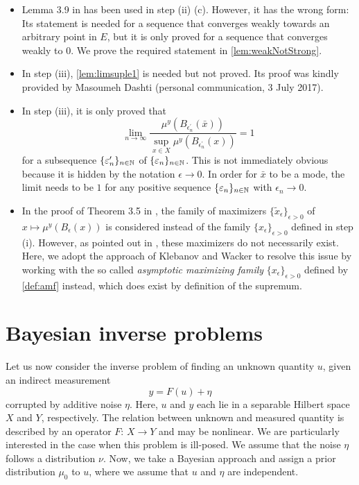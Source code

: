 \documentclass[english]{jnsao}
\theoremstyle{definition}
\begin{document}
\begin{itemize}
	\item[(C1)] Lemma 3.9 in \cite{Dashti:2013} has been used in step (ii) (c). However, it has the wrong form: Its statement is needed for a sequence that converges weakly towards an arbitrary point in $E$, but it is only proved for a sequence that converges weakly to $0$. We prove the required statement in \cref{lem:weakNotStrong}.
	\item[(C2)] In step (iii), \cref{lem:limsuple1} is needed but not proved. Its proof was kindly provided by Masoumeh Dashti (personal communication, 3 July 2017).
	\item[(C3)] In step (iii), it is only proved that
	\[ \lim_{n\to\infty} \frac{\mu^y(B_{\epsilon_n^\prime}(\bar{x}))}{\sup_{x \in X} \mu^y(B_{\epsilon_n^\prime}(x))} = 1 \]
	for a subsequence $\{\varepsilon_n^\prime\}_{n\in\mathbb{N}}$ of $\{\varepsilon_n\}_{n\in\mathbb{N}}$. This is not immediately obvious because it is hidden by the notation $\epsilon \to 0$. In order for $\bar{x}$ to be a mode, the limit needs to be $1$ for any positive sequence $\{\varepsilon_n\}_{n\in\mathbb{N}}$ with $\epsilon_n \to 0$.
	\item[(C4)] In the proof of Theorem 3.5 in \cite{Dashti:2013}, the family of maximizers $\{\tilde{x}_\epsilon\}_{\epsilon > 0}$ of $x \mapsto \mu^y(B_\epsilon(x))$ is considered instead of the family $\{x_\epsilon\}_{\epsilon > 0}$ defined in step (i). However, as pointed out in \cite{klebanov2022}, these maximizers do not necessarily exist. Here, we adopt the approach of Klebanov and Wacker to resolve this issue by working with the so called \emph{asymptotic maximizing family} $\{x_\epsilon\}_{\epsilon > 0}$ defined by \eqref{def:amf} instead, which does exist by definition of the supremum.
\end{itemize}


\section{Bayesian inverse problems}
\label{sect_ip}

Let us now consider the inverse problem of finding an unknown quantity $u$, given an indirect measurement
\begin{equation}
	\label{inv_prob}
	y = F(u) + \eta
\end{equation}
corrupted by additive noise $\eta$. Here, $u$ and $y$ each lie in a separable Hilbert space $X$ and $Y$, respectively. The relation between unknown and measured quantity is described by an operator $F$: $X \to Y$ and may be nonlinear.
We are particularly interested in the case when this problem is ill-posed.
We assume that the noise $\eta$ follows a distribution $\nu$.
Now, we take a Bayesian approach and assign a prior distribution $\mu_0$ to $u$, where we assume that $u$ and $\eta$ are independent. 
\end{document}

